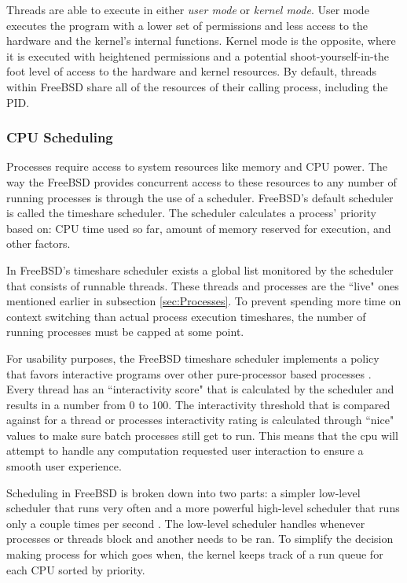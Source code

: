 \documentclass[10pt,draftclsnofoot,onecolumn]{IEEEtran}
\begin{document}
\par Threads are able to execute in either \textit{user mode} or \textit{kernel mode}.
User mode executes the program with a lower set of permissions and less access to the hardware and the kernel's internal functions.
Kernel mode is the opposite, where it is executed with heightened permissions and a potential shoot-yourself-in-the foot level of access to the hardware and kernel resources.
By default, threads within FreeBSD share all of the resources of their calling process, including the PID.\\

\subsubsection{CPU Scheduling}
\label{sub:CPU Scheduling FreeBSD}
\par Processes require access to system resources like memory and CPU power.
The way the FreeBSD provides concurrent access to these resources to any number of running processes is through the use of a scheduler.
FreeBSD's default scheduler is called the timeshare scheduler.
The scheduler calculates a process' priority based on: CPU time used so far, amount of memory reserved for execution, and other factors.

\par In FreeBSD's timeshare scheduler exists a global list monitored by the scheduler that consists of runnable threads.
These threads and processes are the ``live" ones mentioned earlier in subsection \ref{sec:Processes}.
To prevent spending more time on context switching than actual process execution timeshares, the number of running processes must be capped at some point.

\par For usability purposes, the FreeBSD timeshare scheduler implements a policy that favors interactive programs over other pure-processor based processes \cite{bsd:1}.
Every thread has an ``interactivity score" that is calculated by the scheduler and results in a number from 0 to 100.
The interactivity threshold that is compared against for a thread or processes interactivity rating is calculated through ``nice" values to make sure batch processes still get to run.
This means that the cpu will attempt to handle any computation requested user interaction to ensure a smooth user experience.

\par Scheduling in FreeBSD is broken down into two parts: a simpler low-level scheduler that runs very often and a more powerful high-level scheduler that runs only a couple times per second \cite{bsd:1}.
The low-level scheduler handles whenever processes or threads block and another needs to be ran.
To simplify the decision making process for which goes when, the kernel keeps track of a run queue for each CPU sorted by priority.\\
\end{document}
